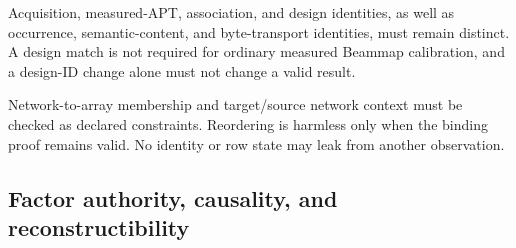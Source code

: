 \begin{description}[style=nextline]
\item[\Req{011}: layered identity.]
  Acquisition, measured-APT, association, and design identities, as well as
  occurrence, semantic-content, and byte-transport identities, must remain
  distinct. A design match is not required for ordinary measured Beammap
  calibration, and a design-ID change alone must not change a valid result.

\item[\Req{012}: array/network consistency and lifetime.]
  Network-to-array membership and target/source network context must be
  checked as declared constraints. Reordering is harmless only when the
  binding proof remains valid. No identity or row state may leak from another
  observation.
\end{description}

\subsection{Factor authority, causality, and reconstructibility}

